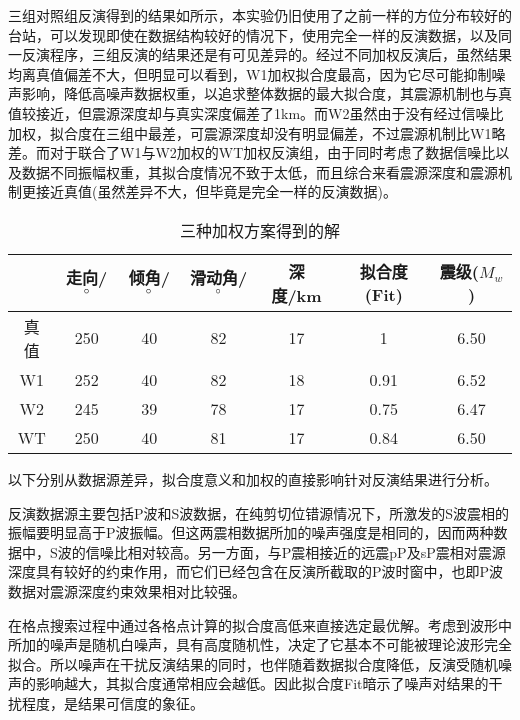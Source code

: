 三组对照组反演得到的结果如所示，本实验仍旧使用了之前一样的方位分布较好的台站，可以发现即使在数据结构较好的情况下，使用完全一样的反演数据，以及同一反演程序，三组反演的结果还是有可见差异的。经过不同加权反演后，虽然结果均离真值偏差不大，但明显可以看到，W1加权拟合度最高，因为它尽可能抑制噪声影响，降低高噪声数据权重，以追求整体数据的最大拟合度，其震源机制也与真值较接近，但震源深度却与真实深度偏差了1km。而W2虽然由于没有经过信噪比加权，拟合度在三组中最差，可震源深度却没有明显偏差，不过震源机制比W1略差。而对于联合了W1与W2加权的WT加权反演组，由于同时考虑了数据信噪比以及数据不同振幅权重，其拟合度情况不致于太低，而且综合来看震源深度和震源机制更接近真值(虽然差异不大，但毕竟是完全一样的反演数据)。
\begin{table}[ht]
\centering
\caption{三种加权方案得到的解}
\label{tab3_01}
    \begin{tabular}{c c c c c c c}
    \hline
     & 走向/$^\circ$ & 倾角/$^\circ$ & 滑动角/$^\circ$ & 深度/km & 拟合度(Fit) & 震级($M_w$)\\
    \hline
    真值	& 250 & 40 & 82 & 17 & 1	& 6.50\\
    W1		& 252 & 40 & 82 & 18 & 0.91 & 6.52\\
    W2		& 245 & 39 & 78 & 17 & 0.75 & 6.47\\
    WT		& 250 & 40 & 81 & 17 & 0.84 & 6.50\\
    \hline
    \end{tabular}
\end{table}

以下分别从数据源差异，拟合度意义和加权的直接影响针对反演结果进行分析。

反演数据源主要包括P波和S波数据，在纯剪切位错源情况下，所激发的S波震相的振幅要明显高于P波振幅。但这两震相数据所加的噪声强度是相同的，因而两种数据中，S波的信噪比相对较高。另一方面，与P震相接近的远震pP及sP震相对震源深度具有较好的约束作用，而它们已经包含在反演所截取的P波时窗中，也即P波数据对震源深度约束效果相对比较强。 

在格点搜索过程中通过各格点计算的拟合度高低来直接选定最优解。考虑到波形中所加的噪声是随机白噪声，具有高度随机性，决定了它基本不可能被理论波形完全拟合。所以噪声在干扰反演结果的同时，也伴随着数据拟合度降低，反演受随机噪声的影响越大，其拟合度通常相应会越低。因此拟合度Fit暗示了噪声对结果的干扰程度，是结果可信度的象征。

